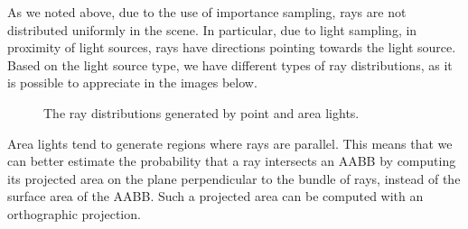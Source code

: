 \documentclass{PoliMi_MasterThesis}
\begin{document}
As we noted above, due to the use of importance sampling, rays are not distributed uniformly in the scene. In particular, due to light sampling, in proximity of light sources, rays have directions pointing towards the light source. Based on the light source type, we have different types of ray distributions, as it is possible to appreciate in the images below.

\begin{figure}[H]
    \centering
		\qquad
	\caption{The ray distributions generated by point and area lights.}
    \label{fig:generated_distributions}
\end{figure}

Area lights tend to generate regions where rays are parallel. This means that we can better estimate the probability that a ray intersects an AABB by computing its projected area on the plane perpendicular to the bundle of rays, instead of the surface area of the AABB. Such a projected area can be computed with an orthographic projection.
\end{document}
